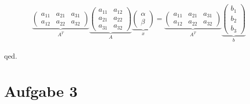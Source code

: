 \documentclass[11pt]{article} %
\begin{document}
\begin{enumerate}[a)]
\begin{eqnarray*}
&&
\underbrace{\begin{pmatrix}a_{11} & a_{21} & a_{31} \\ a_{12} & a_{22} & a_{32}\end{pmatrix}}_{A^T}
\underbrace{\begin{pmatrix} a_{11} & a_{12} \\ a_{21} & a_{22} \\ a_{31} & a_{32} \end{pmatrix}}_{A}
\underbrace{\begin{pmatrix} \alpha \\ \beta \end{pmatrix}}_{x}
=
\underbrace{\begin{pmatrix}a_{11} & a_{21} & a_{31} \\ a_{12} & a_{22} & a_{32}\end{pmatrix}}_{A^T}
\underbrace{\begin{pmatrix} b_1 \\  b_2 \\ b_3 \end{pmatrix}}_{b}
\end{eqnarray*} 

qed.

\end{enumerate}

\section*{Aufgabe 3}
\end{document}
